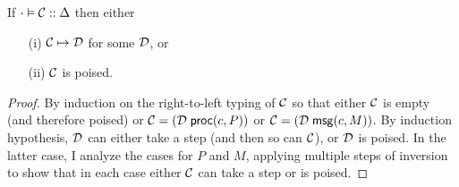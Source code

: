 \begin{theorem}
\label{thm:progress}
\mbox{}
If $\cdot \vDash \mathcal{C} :: \Delta$ then either
\begin{enumerate}
\item[(i)] $\mathcal{C} \mapsto \mathcal{D}$ for some $\mathcal{D}$, or
\item[(ii)] $\mathcal{C}$ is poised.
\end{enumerate}
\end{theorem}
\begin{proof}
By induction on the right-to-left typing of $\mathcal{C}$ so that either
$\mathcal{C}$ is empty (and therefore poised) or
$\mathcal{C} = (\mathcal{D}\; \mathsf{proc}(c, P))$ or
$\mathcal{C} = (\mathcal{D}\; \mathsf{msg}(c, M))$. By induction hypothesis, $\mathcal{D}$ can
either take a step (and then so can $\mathcal{C}$), or $\mathcal{D}$ is poised.  In
the latter case, I
analyze the cases for $P$ and $M$, applying multiple steps of
inversion to show that in each
case either $\mathcal{C}$ can take a step or is poised.
\end{proof}
